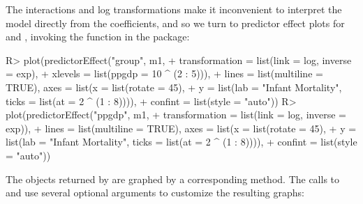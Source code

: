 \documentclass[article]{jss}
\begin{document}
The interactions and log transformations make it inconvenient to
interpret the model directly from the coefficients, and so we turn to
predictor effect plots for  and , invoking the
 function in the  package:
%
\begin{Schunk}
\begin{Sinput}
R> plot(predictorEffect("group", m1,
+    transformation = list(link = log, inverse = exp),
+    xlevels = list(ppgdp = 10 ^ (2 : 5))),
+    lines = list(multiline = TRUE), axes = list(x = list(rotate = 45),
+    y = list(lab = "Infant Mortality", ticks = list(at = 2 ^ (1 : 8)))),
+    confint = list(style = "auto"))
R> plot(predictorEffect("ppgdp", m1,
+    transformation = list(link = log, inverse = exp)),
+    lines = list(multiline = TRUE), axes = list(x = list(rotate = 45),
+    y = list(lab = "Infant Mortality", ticks = list(at = 2 ^ (1 : 8)))),
+    confint = list(style = "auto"))
\end{Sinput}
\end{Schunk}
%
The objects returned by  are graphed by a
corresponding  method. The calls to 
and  use several optional arguments to customize the
resulting graphs:
\end{document}
